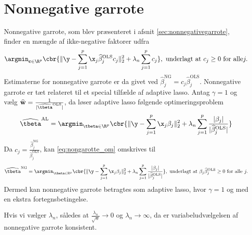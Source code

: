\section{Nonnegative garrote} \label{sec:asymptotics_nonnegative}
Nonnegative garrote, som blev præsenteret i afsnit \ref{sec:nonnegativegarrote}, finder en mængde af ikke-negative faktorer udfra
\begin{align}
\argmin_{\mathbf{c} \in \R^p} \cbr{\Vert \y - \sum_{j=1}^p \x_j \widehat{\beta}_j^\text{OLS} c_j \Vert_2^2 + \lambda_n \sum_{j=1}^p c_j}, \ \text{underlagt at } c_j \geq 0 \text{ for alle} j. \label{eq:nongarotte_om}
\end{align}
Estimaterne for nonnegative garrote er da givet ved \(\widehat{\beta}_j^\text{NG} = c_j \widehat{\beta}_j^\text{OLS}\).
Nonnegative garrote er tæt relateret til et special tilfælde af adaptive lasso.
Antag \(\gamma=1\) og vælg \(\widehat{\mathbf{w}}=\frac{1}{\vert \widehat{\tbeta}^{\text{OLS}} \vert}\), da løser adaptive lasso følgende optimeringsproblem
\begin{align}
\widehat{\tbeta}^\text{AL} = \argmin_{\tbeta \in \R^p} \cbr{ \Vert \y - \sum_{j=1}^p \x_j \beta_j \Vert_2^2 + \lambda_n \sum_{j=1}^p \frac{\vert \beta_j \vert}{\vert \widehat{\beta}_j^\text{OLS} \vert}} \label{eq:AL8}
\end{align}
Da \(c_j = \frac{\widehat{\beta}_j^\text{NG}}{\widehat{\beta}_j^\text{OLS}}\), kan \eqref{eq:nongarotte_om} omskrives til
\begin{align*}
\widehat{\tbeta}^\text{NG} =\argmin_{\tbeta \in \mathbb{R}^p}  \cbr{ \Vert \y - \sum_{j=1}^p \x_j \beta_j \Vert_2^2 + \lambda_n \sum_{j=1}^p  \frac{\vert \beta_j\vert}{\vert\widehat{\beta}_j^\text{OLS}\vert}}, \ \text{underlagt at } \beta_j \widehat{\beta}_j^\text{OLS} \geq 0 \text{ for alle } j.
\end{align*}
Dermed kan nonnegative garrote betragtes som adaptive lasso, hvor \(\gamma=1\) og med en ekstra fortegnsbetingelse.
%
\begin{cor}
Hvis vi vælger \(\lambda_n\), således at \(\frac{\lambda_n}{\sqrt{n}} \rightarrow 0\) og \(\lambda_n \rightarrow \infty\), da er variabeludvælgelsen af nonnegative garrote konsistent.
\end{cor}
%
